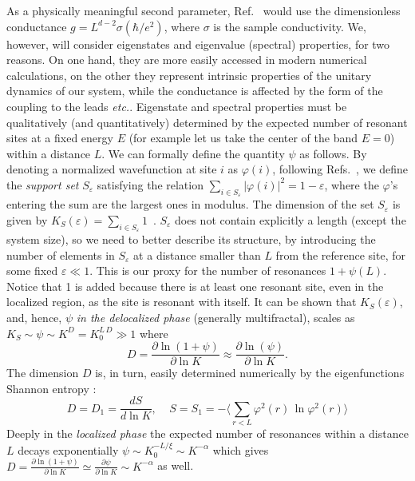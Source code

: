 \documentclass[reprint,aps,prl,superscriptaddress,english,nolongbibliography]{revtex4-1}
\begin{document}
As a physically meaningful second parameter, Ref.~\cite{abrahams1979scaling} would use the dimensionless conductance $g=L^{d-2}\sigma (\hbar/e^{2})$, where $\sigma$ is the sample conductivity. We, however, will consider eigenstates and eigenvalue (spectral) properties, for two reasons. On one hand, they are more easily accessed in modern numerical calculations, on the other they represent intrinsic properties of the unitary dynamics of our system, while the conductance is affected by the form of the coupling to the leads {\it etc.}. Eigenstate and spectral properties must be qualitatively (and quantitatively) determined by the expected number of resonant sites at a fixed energy $E$ (for example let us take the center of the band $E=0$) within a distance $L$. We can formally define the quantity $\psi$ as follows. By denoting a normalized wavefunction at site $i$ as $\varphi(i)$, following Refs.~\cite{support_set,kravtsov2018non}, we define the {\it support set} $S_{\varepsilon}$ satisfying the relation $\sum_{i \in S_{\varepsilon}} |\varphi(i)|^2 = 1 - \varepsilon$, where the $\varphi$'s entering the sum are the largest ones in modulus. The dimension of the set $S_{\varepsilon}$ is given by $K_S(\varepsilon) = \sum_{i \in S_{\varepsilon}} 1$~\cite{kutlin2024investigating}. $S_{\varepsilon}$ does not contain explicitly a length (except the system size), so we need to better describe its structure, by introducing the number of elements in $S_{\varepsilon}$ at a distance smaller than $L$ from the reference site, for some fixed $\varepsilon \ll 1$. This is our proxy for the number of resonances $1+\psi(L)$. Notice that 1 is added because there is at least one resonant site, even in the localized region, as the site is resonant with itself. It can be shown \cite{support_set} that $K_S(\varepsilon)$, and, hence, $\psi$ {\it in the delocalized phase} (generally multifractal), scales as $K_S\sim\psi\sim K^{D}=K_{0}^{L\,D}\gg 1$ where 
\begin{equation}\label{D_1}
 D=\frac{\partial\ln(1+\psi)}{\partial\ln K}\approx \frac{\partial\ln(\psi)}{\partial\ln K}. 
\end{equation}
The dimension $D$ is, in turn, easily determined numerically by the eigenfunctions Shannon entropy \cite{support_set}:
\begin{equation}\label{S_1}
D=D_{1}=\frac{dS}{d\ln K},\;\;\;\;S=S_{1}=-\Big\langle\sum_{r<L}\varphi^{2}(r)\,\ln \varphi^{2}(r)\Big\rangle
\end{equation}
Deeply in the {\it localized phase} the expected number of resonances within a distance $L$ decays exponentially $\psi\sim K_0^{-L/\xi}\sim K^{-\alpha}$ which gives $D=\frac{\partial\ln(1+\psi)}{\partial\ln K}\simeq\frac{\partial\psi}{\partial\ln K}\sim K^{-\alpha}$ as well. 
\end{document}
